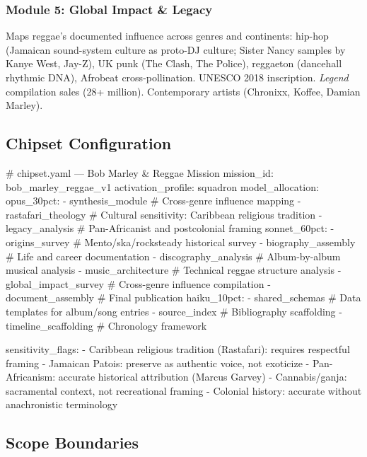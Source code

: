 \documentclass[11pt,letterpaper]{article}
\begin{document}
\subsubsection{Module 5: Global Impact \& Legacy}
Maps reggae's documented influence across genres and continents: hip-hop (Jamaican sound-system culture as proto-DJ culture; Sister Nancy samples by Kanye West, Jay-Z), UK punk (The Clash, The Police), reggaeton (dancehall rhythmic DNA), Afrobeat cross-pollination. UNESCO 2018 inscription. \textit{Legend} compilation sales (28+ million). Contemporary artists (Chronixx, Koffee, Damian Marley).

\subsection{Chipset Configuration}

\begin{asciibox}
# chipset.yaml — Bob Marley & Reggae Mission
mission_id: bob_marley_reggae_v1
activation_profile: squadron
model_allocation:
  opus_30pct:
    - synthesis_module          # Cross-genre influence mapping
    - rastafari_theology        # Cultural sensitivity: Caribbean religious tradition
    - legacy_analysis           # Pan-Africanist and postcolonial framing
  sonnet_60pct:
    - origins_survey            # Mento/ska/rocksteady historical survey
    - biography_assembly        # Life and career documentation
    - discography_analysis      # Album-by-album musical analysis
    - music_architecture        # Technical reggae structure analysis
    - global_impact_survey      # Cross-genre influence compilation
    - document_assembly         # Final publication
  haiku_10pct:
    - shared_schemas            # Data templates for album/song entries
    - source_index              # Bibliography scaffolding
    - timeline_scaffolding      # Chronology framework

sensitivity_flags:
  - Caribbean religious tradition (Rastafari): requires respectful framing
  - Jamaican Patois: preserve as authentic voice, not exoticize
  - Pan-Africanism: accurate historical attribution (Marcus Garvey)
  - Cannabis/ganja: sacramental context, not recreational framing
  - Colonial history: accurate without anachronistic terminology
\end{asciibox}

\subsection{Scope Boundaries}
\end{document}
